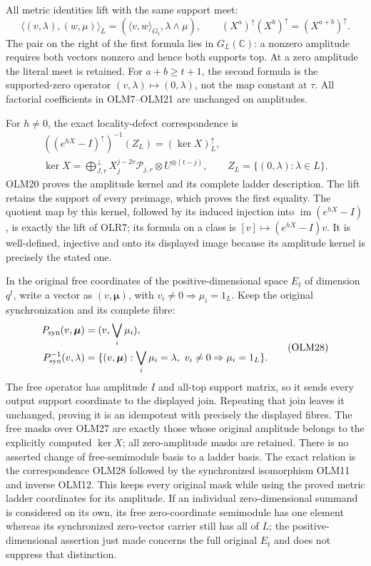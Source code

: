 All metric identities lift with the same support meet:
\[
\langle(v,\lambda),(w,\mu)\rangle_L
=(\langle v,w\rangle_{G_t},\lambda\wedge\mu),
\qquad
(X^a)^\uparrow(X^b)^\uparrow=(X^{a+b})^\uparrow.
\tag{OLM26}
\]
The pair on the right of the first formula lies in
$G_L(\mathbb C)$: a nonzero amplitude requires both vectors
nonzero and hence both supports top. At a zero amplitude the
literal meet is retained.
For $a+b\ge t+1$, the second formula is the supported-zero
operator $(v,\lambda)\mapsto(0,\lambda)$, not the map constant
at $\tau$. All factorial coefficients in OLM7--OLM21 are
unchanged on amplitudes.

For $h\ne0$, the exact locality-defect correspondence is
\[
\begin{gathered}
((e^{hX}-I)^\uparrow)^{-1}(Z_L)=(\ker X)_L^\uparrow,\\
\ker X=\mathop{\bigoplus}_{J,r}^{\perp}
 X_j^{j-2r}\mathcal P_{j,r}\otimes U^{\otimes(t-j)},
\qquad Z_L=\{(0,\lambda):\lambda\in L\}.
\end{gathered}
\tag{OLM27}
\]
OLM20 proves the amplitude kernel and its complete ladder
description. The lift retains the support of every preimage,
which proves the first equality. The quotient map by this
kernel, followed by its induced injection into
$\operatorname{im}(e^{hX}-I)$, is exactly the lift of OLR7;
its formula on a class is $[v]\mapsto(e^{hX}-I)v$.
It is well-defined, injective and onto its displayed image
because its amplitude kernel is precisely the stated one.

In the original free coordinates of the positive-dimensional
space $E_t$ of dimension $q^t$, write a vector as
$(v,\boldsymbol\mu)$, with $v_i\ne0\Rightarrow\mu_i=1_L$.
Keep the original synchronization and its complete fibre:
\[
\begin{split}
P_{\rm syn}(v,\boldsymbol\mu)&=(v,\bigvee_i\mu_i),\\
P_{\rm syn}^{-1}(v,\lambda)
&=\{(v,\boldsymbol\mu):\bigvee_i\mu_i=\lambda,
                           \ v_i\ne0\Rightarrow\mu_i=1_L\}.
\end{split}
\tag{OLM28}
\]
The free operator has amplitude $I$ and all-top support matrix,
so it sends every output support coordinate to the displayed
join. Repeating that join leaves it unchanged, proving it is
an idempotent with precisely the displayed fibres.
The free masks over OLM27 are exactly those whose original
amplitude belongs to the explicitly computed $\ker X$; all
zero-amplitude masks are retained.
There is no asserted change of free-semimodule basis to a
ladder basis. The exact relation is the correspondence OLM28
followed by the synchronized isomorphism OLM11 and inverse
OLM12. This keeps every original mask while using the proved
metric ladder coordinates for its amplitude.
If an individual zero-dimensional summand is considered on
its own, its free zero-coordinate semimodule has one element
whereas its synchronized zero-vector carrier still has all
of $L$; the positive-dimensional assertion just made concerns
the full original $E_t$ and does not suppress that distinction.

